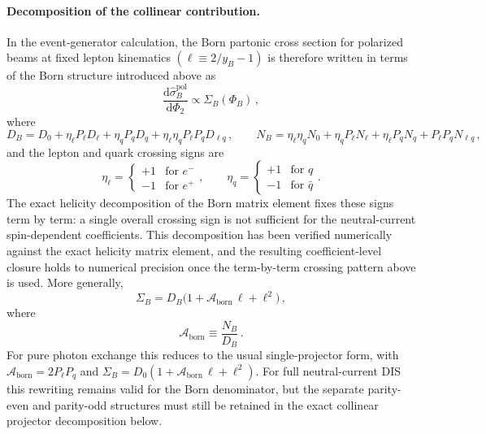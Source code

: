 \documentclass[a4paper,11pt]{article}
\begin{document}
\paragraph{Decomposition of the collinear contribution.}
In the event-generator calculation, the Born partonic cross section for polarized beams at fixed lepton kinematics $(\ell \equiv 2/y_B - 1)$ is therefore written in terms of the Born structure introduced above as
\begin{equation}
  \frac{\mathrm{d}\hat\sigma_B^{\text{pol}}}{\mathrm{d}\Phi_2} \propto \Sigma_B(\Phi_B)\,,
\end{equation}
where
\begin{equation}
  D_B=D_0+\eta_\ell P_\ell D_\ell+\eta_q P_q D_q+\eta_\ell\eta_q P_\ell P_q D_{\ell q}\,,
  \qquad
  N_B=\eta_\ell\eta_q N_0+\eta_q P_\ell N_\ell+\eta_\ell P_q N_q+P_\ell P_q N_{\ell q}\,,
\end{equation}
and the lepton and quark crossing signs are
\begin{equation}
  \eta_\ell =
  \begin{cases}
    +1 & \text{for } e^- \\
    -1 & \text{for } e^+
  \end{cases},
  \qquad
  \eta_q =
  \begin{cases}
    +1 & \text{for } q \\
    -1 & \text{for } \bar q
  \end{cases}.
\end{equation}
The exact helicity decomposition of the Born matrix element fixes these signs term by term: a single overall crossing sign is not sufficient for the neutral-current spin-dependent coefficients.
This decomposition has been verified numerically against the exact helicity matrix element, and the resulting coefficient-level closure holds to numerical precision once the term-by-term crossing pattern above is used.
More generally,
\begin{equation}
  \Sigma_B = D_B\bigl(1+\mathcal{A}_{\text{born}}\,\ell+\ell^2\bigr)\,,
\end{equation}
where
\begin{equation}
  \mathcal{A}_{\text{born}}\equiv \frac{N_B}{D_B}\,.
\end{equation}
For pure photon exchange this reduces to the usual single-projector form, with $\mathcal{A}_{\text{born}}=2P_\ell P_q$ and $\Sigma_B=D_0(1+\mathcal{A}_{\text{born}}\,\ell+\ell^2)$. For full neutral-current DIS this rewriting remains valid for the Born denominator, but the separate parity-even and parity-odd structures must still be retained in the exact collinear projector decomposition below.
\end{document}
